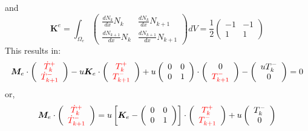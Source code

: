 and 
\[
{\bm K}^e =
\int_{\Omega_e} 
\left(
\begin{array}{cc}
\frac{dN_k}{dx} N_k     & \frac{dN_k}{dx} N_{k+1} \\
\frac{dN_{k+1}}{dx} N_k & \frac{dN_{k+1}}{dx} N_{k+1}
\end{array}
\right)
dV
=
\frac{1}{2}
\left(
\begin{array}{cc}
-1  & -1 \\
1 & 1
\end{array}
\right)
\]
This results in:
\begin{eqnarray}
{\bm M}_e 
\cdot
\left(
\begin{array}{cc}
{\color{red}\dot T_k^+}  \\
{\color{red} \dot T_{k+1}^-} 
\end{array}
\right) 
-u {\bm K}_e \cdot \left(
\begin{array}{cc}
     {\color{red}T_k^+}  \\
     {\color{red}T_{k+1}^-} 
\end{array}
\right) + 
u
\left( 
\begin{array}{cc}
0 & 0 \\
0 & 1 
\end{array}
\right)
\cdot
\left( 
\begin{array}{c}
0   \\
{\color{red}T_{k+1}^-} 
\end{array}
\right)
-\left(
\begin{array}{cc}
     u{T_{k}^-}   \\
     0 
\end{array}
\right)=0
\end{eqnarray}
or,
\begin{eqnarray}
{\bm M}_e \cdot
\left(
\begin{array}{cc}
{\color{red}\dot T_k^+}  \\
{\color{red} \dot T_{k+1}^-} 
\end{array}
\right) 
=
u \left[ {\bm K}_e -
\left(\begin{array}{cc}
0 & 0 \\
0 & 1 
\end{array}\right)
\right] \cdot 
\left( \begin{array}{cc}
{\color{red}T_k^+}  \\
{\color{red}T_{k+1}^-} 
\end{array} \right) 
+u \left( \begin{array}{cc}
{T_{k}^-}   \\  0 
\end{array} \right)
\end{eqnarray}


